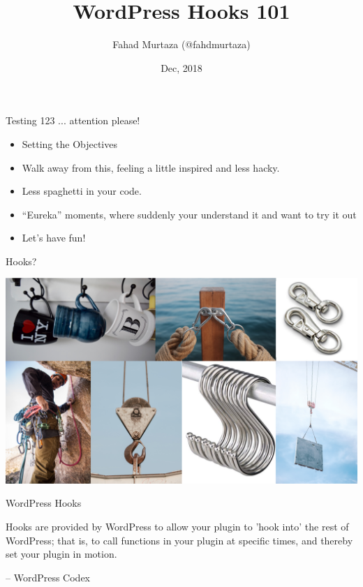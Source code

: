 \documentclass[10pt]{beamer}
\title{WordPress Hooks 101}
\date{Dec, 2018}
\author{Fahad Murtaza (@fahdmurtaza)}
\institute{WordCamp Biratnagar, 2018}
\begin{document}
    \maketitle

    \begin{frame}{Testing 123 ... attention please!}
        \begin{itemize}
            \item Setting the Objectives
            \item Walk away from this, feeling a little inspired and less hacky.
            \item Less spaghetti in your code. 
            \item “Eureka” moments, where suddenly your understand it and want to try it out
            \item Let’s have fun!
        \end{itemize}
    \end{frame}

    \begin{frame}{Hooks?}
        \begin{center}
            \includegraphics[width=1\textwidth]{images/hooks}
        \end{center}
    \end{frame}

    \begin{frame}{WordPress Hooks}
        \begin{large}
            Hooks are provided by WordPress to allow your plugin to 'hook into' the rest of WordPress; that is, to call functions in your plugin at specific times, and thereby set your plugin in motion.   
        \end{large}
        \begin{flushright}
            -- WordPress Codex
        \end{flushright}
    \end{frame}
\end{document}
